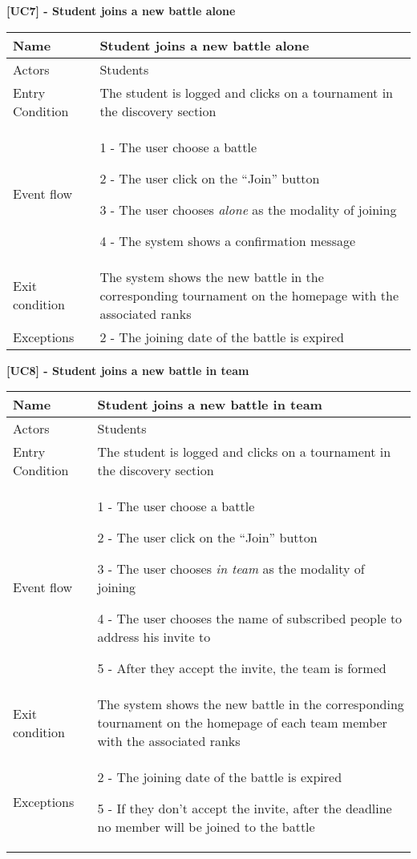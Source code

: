     \begin{table}[h]
    \textbf{[UC7] - Student joins a new battle alone}
    
      \centering
      \begin{tabular}{|p{3cm}|p{14cm}|}
        \hline
        Name & Student joins a new battle alone \\
        \hline
        Actors & Students \\
        \hline
        Entry Condition & The student is logged and clicks on a tournament in the discovery section \\
        \hline
        Event flow &  1 - The user choose a battle
        
        2 - The user click on the ``Join'' button

        3 - The user chooses \textit{alone} as the modality of joining

        4 - The system shows a confirmation message
        \\
        \hline
        Exit condition & The system shows the new battle in the corresponding tournament on the homepage with the associated ranks \\
        \hline
        Exceptions & 2 - The joining date of the battle is expired  
        \\
        \hline
      \end{tabular}
      
    \end{table}

    \begin{table}[h]
      \textbf{[UC8] - Student joins a new battle in team}
      
      \centering
      \begin{tabular}{|p{3cm}|p{14cm}|}
        \hline
        Name & Student joins a new battle in team \\
        \hline
        Actors & Students \\
        \hline
        Entry Condition & The student is logged and clicks on a tournament in the discovery section \\
        \hline
        Event flow &  1 - The user choose a battle
        
        2 - The user click on the ``Join'' button

        3 - The user chooses \textit{in team} as the modality of joining

        4 - The user chooses the name of subscribed people to address his invite to

        5 - After they accept the invite, the team is formed
        \\
        \hline
        Exit condition & The system shows the new battle in the corresponding tournament on the homepage of each team member with the associated ranks \\
        \hline
        Exceptions & 2 - The joining date of the battle is expired  

        5 - If they don't accept the invite, after the deadline no member will be joined to the battle
        \\
        \hline
      \end{tabular}
    \end{table}


